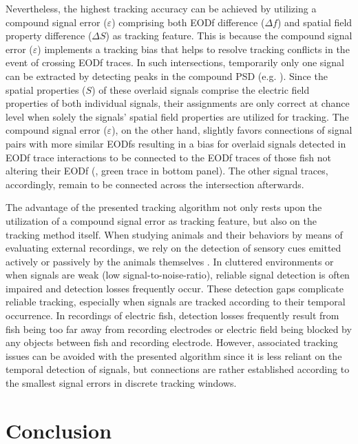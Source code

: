 Nevertheless, the highest tracking accuracy can be achieved by utilizing a compound signal error ($\varepsilon$) comprising both EODf difference ($\Delta f$) and spatial field property difference ($\Delta S$) as tracking feature. This is because the compound signal error ($\varepsilon$) implements a tracking bias that helps to resolve tracking conflicts in the event of crossing EODf traces. In such intersections, temporarily only one signal can be extracted by detecting peaks in the compound PSD (e.g. ). Since the spatial properties ($S$) of these overlaid signals comprise the electric field properties of both individual signals, their assignments are only correct at chance level when solely the signals' spatial field properties are utilized for tracking. The compound signal error ($\varepsilon$), on the other hand, slightly favors connections of signal pairs with more similar EODfs resulting in a bias for overlaid signals detected in EODf trace interactions to be connected to the EODf traces of those fish not altering their EODf (, green trace in bottom panel). The other signal traces, accordingly, remain to be connected across the intersection afterwards. 

The advantage of the presented tracking algorithm not only rests upon the utilization of a compound signal error as tracking feature, but also on the tracking method itself. When studying animals and their behaviors by means of evaluating external recordings, we rely on the detection of sensory cues emitted actively or passively by the animals themselves \citep{Dell2014, Hughey2018}. In cluttered environments or when signals are weak (low signal-to-noise-ratio), reliable signal detection is often impaired and detection losses frequently occur. These detection gaps complicate reliable tracking, especially when signals are tracked according to their temporal occurrence. In recordings of electric fish, detection losses frequently result from fish being too far away from recording electrodes or electric field being blocked by any objects between fish and recording electrode. However, associated tracking issues can be avoided with the presented algorithm since it is less reliant on the temporal detection of signals, but connections are rather established according to the smallest signal errors in discrete tracking windows.

\section{Conclusion}

